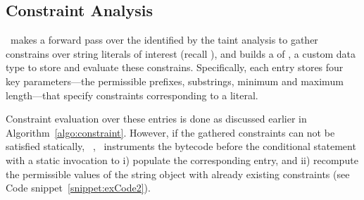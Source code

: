 
\subsection{Constraint Analysis}
\label{subsec:constraint analysis}

\tool\ makes a forward pass over the  identified by the taint
analysis to gather constrains over string literals of interest (recall
), and builds a  of
, a custom data type to store and evaluate these
constrains. Specifically, each  entry stores four key
parameters---the permissible prefixes, substrings, minimum and maximum
length---that specify constraints corresponding to a  literal.

Constraint evaluation over these  entries is done as
discussed earlier in Algorithm~\ref{algo:constraint}. However, if the gathered
constraints can not be satisfied statically, \eg\
, \tool\ instruments the bytecode before the
conditional statement with a static invocation to i) populate the corresponding
\code{ConstraintDataType} entry, and ii) recompute the permissible values of the
string object with already existing constraints (see Code
snippet~\ref{snippet:exCode2}).



